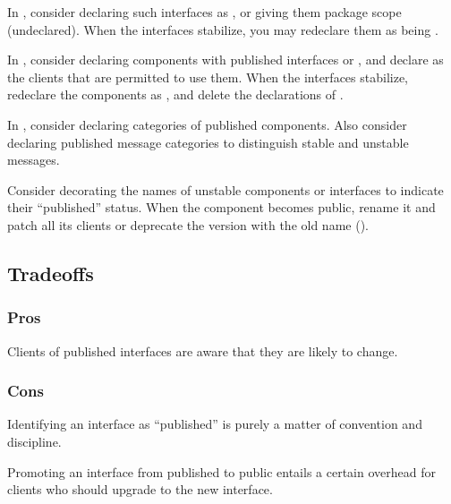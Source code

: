 \documentclass[a4paper,10pt,twoside]{book}
\begin{document}
\begin{bulletlist}
\item In , consider declaring such interfaces as , or giving them package scope (undeclared). When the interfaces stabilize, you may redeclare them as being .

\item In , consider declaring components with published interfaces  or , and declare as  the clients that are permitted to use them. When the interfaces stabilize, redeclare the components as , and delete the declarations of .

\item In , consider declaring categories of published components. Also consider declaring published message categories to distinguish stable and unstable messages.

\item Consider decorating the names of unstable components or interfaces to indicate their ``published'' status. When the component becomes public, rename it and patch all its clients or deprecate the version with the old name ().
\end{bulletlist}

\subsection*{Tradeoffs}

\subsubsection*{Pros}

\begin{bulletlist}
\item Clients of published interfaces are aware that they are likely to change.
\end{bulletlist}

\subsubsection*{Cons}

\begin{bulletlist}
\item Identifying an interface as ``published'' is purely a matter of convention and discipline.

\item Promoting an interface from published to public entails a certain overhead for clients who should upgrade to the new interface.
\end{bulletlist}
\end{document}
